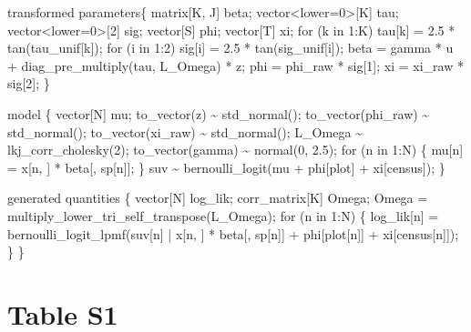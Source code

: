 \documentclass[
  12pt,
  letterpaper,
  DIV=11,
  numbers=noendperiod]{scrartcl}
\newenvironment{Shaded}{\begin{snugshade}}{\end{snugshade}}
\newcommand{\ControlFlowTok}[1]{\textcolor[rgb]{0.00,0.23,0.31}{#1}}
\newcommand{\DataTypeTok}[1]{\textcolor[rgb]{0.68,0.00,0.00}{#1}}
\newcommand{\DecValTok}[1]{\textcolor[rgb]{0.68,0.00,0.00}{#1}}
\newcommand{\FloatTok}[1]{\textcolor[rgb]{0.68,0.00,0.00}{#1}}
\newcommand{\KeywordTok}[1]{\textcolor[rgb]{0.00,0.23,0.31}{#1}}
\newcommand{\NormalTok}[1]{\textcolor[rgb]{0.00,0.23,0.31}{#1}}
\begin{document}
\begin{Shaded}
\begin{Highlighting}[]
\KeywordTok{transformed parameters}\NormalTok{\{}
  \DataTypeTok{matrix}\NormalTok{[K, J] beta;}
  \DataTypeTok{vector}\NormalTok{\textless{}}\KeywordTok{lower}\NormalTok{=}\DecValTok{0}\NormalTok{\textgreater{}[K] tau;}
  \DataTypeTok{vector}\NormalTok{\textless{}}\KeywordTok{lower}\NormalTok{=}\DecValTok{0}\NormalTok{\textgreater{}[}\DecValTok{2}\NormalTok{] sig;}
  \DataTypeTok{vector}\NormalTok{[S] phi;}
  \DataTypeTok{vector}\NormalTok{[T] xi;}
  \ControlFlowTok{for}\NormalTok{ (k }\ControlFlowTok{in} \DecValTok{1}\NormalTok{:K) tau[k] = }\FloatTok{2.5}\NormalTok{ * tan(tau\_unif[k]);}
  \ControlFlowTok{for}\NormalTok{ (i }\ControlFlowTok{in} \DecValTok{1}\NormalTok{:}\DecValTok{2}\NormalTok{) sig[i] = }\FloatTok{2.5}\NormalTok{ * tan(sig\_unif[i]);}
\NormalTok{  beta = gamma * u + diag\_pre\_multiply(tau, L\_Omega) * z;}
\NormalTok{  phi = phi\_raw * sig[}\DecValTok{1}\NormalTok{];}
\NormalTok{  xi = xi\_raw * sig[}\DecValTok{2}\NormalTok{];}
\NormalTok{\}}

\KeywordTok{model}\NormalTok{ \{}
  \DataTypeTok{vector}\NormalTok{[N] mu;}
\NormalTok{  to\_vector(z) \textasciitilde{} std\_normal();}
\NormalTok{  to\_vector(phi\_raw) \textasciitilde{} std\_normal();}
\NormalTok{  to\_vector(xi\_raw) \textasciitilde{} std\_normal();}
\NormalTok{  L\_Omega \textasciitilde{} lkj\_corr\_cholesky(}\DecValTok{2}\NormalTok{);}
\NormalTok{  to\_vector(gamma) \textasciitilde{} normal(}\DecValTok{0}\NormalTok{, }\FloatTok{2.5}\NormalTok{);}
  \ControlFlowTok{for}\NormalTok{ (n }\ControlFlowTok{in} \DecValTok{1}\NormalTok{:N) \{}
\NormalTok{    mu[n] = x[n, ] * beta[, sp[n]];}
\NormalTok{  \}}
\NormalTok{  suv \textasciitilde{} bernoulli\_logit(mu + phi[plot] + xi[census]);}
\NormalTok{\}}

\KeywordTok{generated quantities}\NormalTok{ \{}
  \DataTypeTok{vector}\NormalTok{[N] log\_lik;}
  \DataTypeTok{corr\_matrix}\NormalTok{[K] Omega;}
\NormalTok{  Omega = multiply\_lower\_tri\_self\_transpose(L\_Omega);}
  \ControlFlowTok{for}\NormalTok{ (n }\ControlFlowTok{in} \DecValTok{1}\NormalTok{:N) \{}
\NormalTok{    log\_lik[n] = bernoulli\_logit\_lpmf(suv[n] | x[n, ] * beta[, sp[n]] +}
\NormalTok{      phi[plot[n]] + xi[census[n]]);}
\NormalTok{  \}}
\NormalTok{\}}
\end{Highlighting}
\end{Shaded}

\newpage

\hypertarget{table-s1}{%
\section{Table S1}\label{table-s1}}
\end{document}
